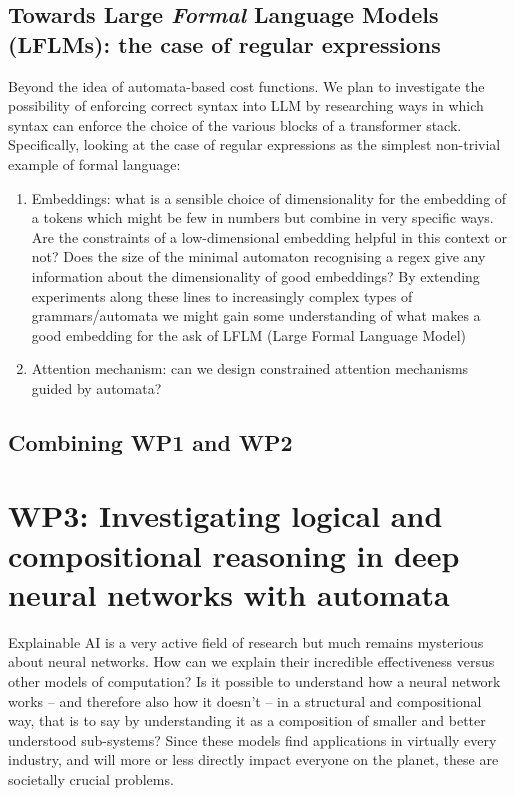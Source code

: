 \documentclass[11pt,a4paper]{article}
\begin{document}
		\subsection{Towards Large \emph{Formal} Language Models (LFLMs): the case of regular expressions}
			Beyond the idea of automata-based cost functions. We plan to investigate the possibility of enforcing correct syntax into LLM by researching ways in which syntax can enforce the choice of the various blocks of a transformer stack. Specifically, looking at the case of regular expressions as the simplest non-trivial example of formal language: 
			\begin{enumerate}
				\item Embeddings: what is a sensible choice of dimensionality for the embedding of a tokens which might be few in numbers but combine in very specific ways. Are the constraints of a low-dimensional embedding helpful in this context or not? Does the size of the minimal automaton recognising a regex give any information about the dimensionality of good embeddings? By extending experiments along these lines to increasingly complex types of grammars/automata we might gain some understanding of what makes a good embedding for the ask of LFLM (Large Formal Language Model)
				\item Attention mechanism: can we design constrained attention mechanisms guided by automata?
			\end{enumerate}
		
		\subsection{Combining WP1 and WP2}
	
	\section*{WP3: Investigating logical and compositional reasoning in deep neural networks with automata}
	Explainable AI is a very active field of research but much remains mysterious about neural networks. How can we explain their incredible effectiveness versus other models of computation? Is it possible to understand how a neural network works -- and therefore also how it doesn't -- in a structural and compositional way, that is to say by understanding it as a composition of smaller and better understood sub-systems? Since these models find applications in virtually every industry, and will more or less directly impact everyone on the planet, these are societally crucial problems. 
	
\end{document}
